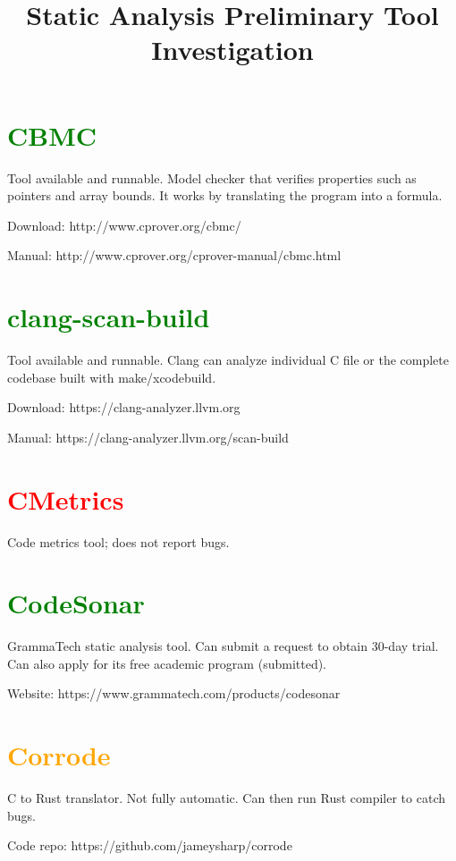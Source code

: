 \documentclass[10pt,letterpaper]{article}
\title{Static Analysis Preliminary Tool Investigation}
\begin{document}
\maketitle

\section{\textcolor{green}{CBMC}}

Tool available and runnable. Model checker that verifies properties
such as pointers and array bounds. It works by translating the program
into a formula. 

Download: http://www.cprover.org/cbmc/

Manual: http://www.cprover.org/cprover-manual/cbmc.html

\section{\textcolor{green}{clang-scan-build}}

Tool available and runnable. Clang can analyze individual C file or
the complete codebase built with make/xcodebuild.

Download: https://clang-analyzer.llvm.org

Manual: https://clang-analyzer.llvm.org/scan-build

\section{\textcolor{red}{CMetrics}}

Code metrics tool; does not report bugs.

\section{\textcolor{green}{CodeSonar}}

GrammaTech static analysis tool. Can submit a request to obtain 30-day trial.
Can also apply for its free academic program (submitted).

Website: https://www.grammatech.com/products/codesonar

\section{\textcolor{orange}{Corrode}}

C to Rust translator. Not fully automatic. Can then run Rust compiler to catch bugs.

Code repo: https://github.com/jameysharp/corrode
\end{document}
